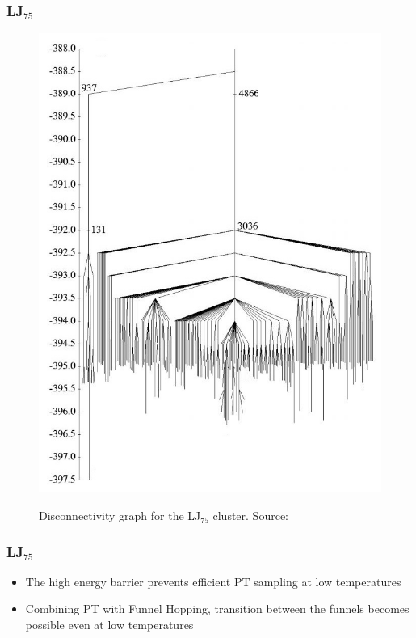 \documentclass{beamer}
\begin{document}
	\begin{frame}
		\frametitle{LJ$_{75}$} %
		\begin{figure}
			\center
			\includegraphics[height=0.85\textheight]{figures/LJ75_disc.jpg}
			\label{fig:LJ38_disc}
			\caption{Disconnectivity graph for the LJ$_{75}$ cluster. Source: \cite{Doye1999}}
		\end{figure}
	\end{frame}
 	
 	\begin{frame}
 		\frametitle{LJ$_{75}$}
 		\begin{itemize}
 			\item The high energy barrier prevents efficient PT sampling at low temperatures
 			\item Combining PT with Funnel Hopping, transition between the funnels becomes possible even at low temperatures

 		\end{itemize}

 	\end{frame}
\end{document}
